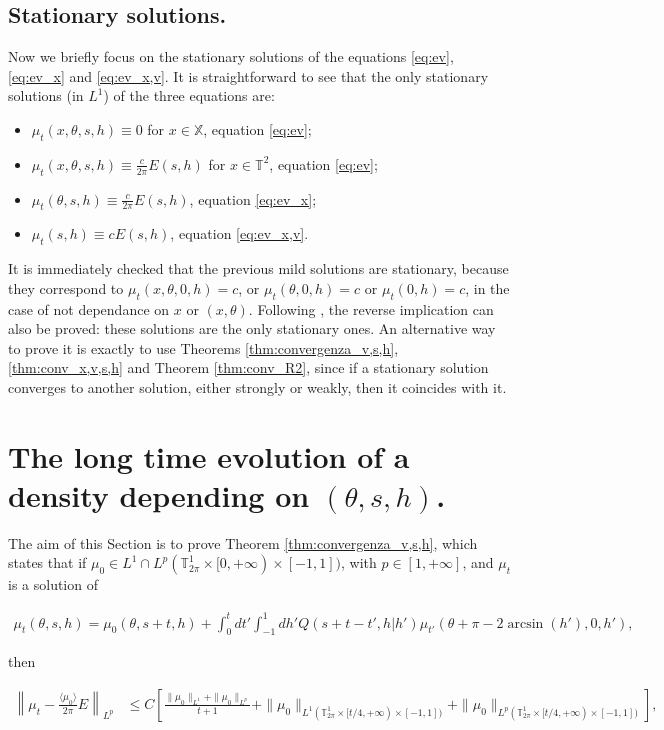 \documentclass[a4paper,10pt,reqno]{amsart}
\numberwithin{equation}{subsection}
\numberwithin{figure}{subsection}
\begin{document}
\subsection{Stationary solutions.} Now we briefly focus on the stationary solutions of the equations \eqref{eq:ev}, \eqref{eq:ev_x} and \eqref{eq:ev_x,v}. It is straightforward to see that the only stationary solutions (in $L^1$) of the three equations are:
\begin{itemize}
\item $\mu_t(x,\theta,s,h)\equiv0$ for $x\in\mathbb{X}$, equation \eqref{eq:ev};
\item $\mu_t(x,\theta,s,h)\equiv\frac{c}{2\pi}E(s,h)$ for $x\in\mathbb{T}^2$, equation \eqref{eq:ev};
\item $\mu_t(\theta,s,h)\equiv\frac{c}{2\pi}E(s,h)$, equation \eqref{eq:ev_x};
\item $\mu_t(s,h)\equiv cE(s,h)$, equation \eqref{eq:ev_x,v}.
\end{itemize}
It is immediately checked that the previous mild solutions are stationary, because they correspond to $\mu_t(x,\theta,0,h)=c$, or $\mu_t(\theta,0,h)=c$ or $\mu_t(0,h)=c$, in the case of not dependance on $x$ or $(x,\theta)$. Following \cite{CG2010}, the reverse implication can also be proved: these solutions are the only stationary ones. An alternative way to prove it is exactly to use Theorems \ref{thm:convergenza_v,s,h}, \ref{thm:conv_x,v,s,h} and Theorem \ref{thm:conv_R2}, since if a stationary solution converges to another solution, either strongly or weakly, then it coincides with it.

\newpage
\section{The long time evolution of a density depending on $(\theta,s,h)$.}\label{thetash}
The aim of this Section is to prove Theorem \ref{thm:convergenza_v,s,h}, which states that if $\mu_0\in L^1\cap L^p(\mathbb{T}^1_{2\pi}\times[0,+\infty)\times[-1,1])$, with $p\in[1,+\infty]$, and $\mu_t$ is a solution of

{\small\begin{align}\label{rapp:ev_nuova}
\mu_t(\theta,s,h)=\mu_0(\theta,s+t,h)+\int_0^tdt'\int_{-1}^1dh'Q(s+t-t',h|h')\mu_{t'}(\theta+\pi-2\arcsin(h'),0,h'),
\end{align}}

then

{\tiny\begin{align*}
\left\|\mu_t-\frac{\langle\mu_0\rangle}{2\pi}E\right\|_{L^p}&\leq C\left[\frac{\|\mu_0\|_{L^1}+\|\mu_0\|_{L^p}}{t+1}+\|\mu_0\|_{L^1(\mathbb{T}^1_{2\pi}\times[t/4,+\infty)\times[-1,1])}+\|\mu_0\|_{L^p(\mathbb{T}^1_{2\pi}\times[t/4,+\infty)\times[-1,1])}\right],
\end{align*}}
\end{document}
